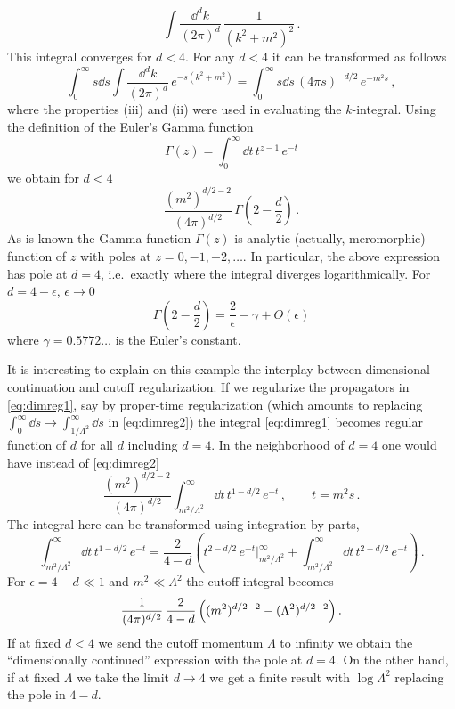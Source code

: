 \begin{equation}\label{eq:dimreg1}
\int\frac{\dd^dk}{(2\pi)^d}\,\frac1{(k^2+m^2)^2}\,.
\end{equation}
This integral converges for $d<4$. For any $d<4$ it can be transformed as
follows
\begin{equation}\label{eq:dimreg2}
\int_0^\infty s\dd s\int\frac{\dd^dk}{(2\pi)^d}\,e^{-s(k^2+m^2)}=\int_0^\infty s\dd s\,(4\pi s)^{-d/2}\,e^{-m^2s}\,,
\end{equation}
where the properties (iii) and (ii) were used in evaluating the $k$-integral.
Using the definition of the Euler's Gamma function
\[
\Gamma(z)=\int_0^\infty \dd t\,t^{z-1}\,e^{-t}
\]
we obtain for $d<4$
\begin{equation}\label{eq:dimreg3}
\frac{(m^2)^{d/2-2}}{(4\pi)^{d/2}}\,\Gamma\left(2-\frac d2\right)\,.
\end{equation}
As is known the Gamma function $\Gamma(z)$ is analytic (actually, meromorphic)
function of $z$ with poles at $z=0,-1,-2,\dots$. In particular, the above
expression has pole at $d=4$, i.e.\ exactly where the integral diverges
logarithmically. For $d=4-\epsilon$, $\epsilon\to0$
\[
\Gamma\left(2-\frac d2\right)=\frac2\epsilon-\gamma+O(\epsilon)
\]
where $\gamma=0.5772\ldots$ is the Euler's constant.

It is interesting to explain on this example the interplay between dimensional
continuation and cutoff regularization. If we regularize the propagators in
\eqref{eq:dimreg1}, say by proper-time regularization (which amounts to
replacing $\int_0^\infty \dd s\to\int_{1/\Lambda^2}^\infty \dd s$ in
\eqref{eq:dimreg2}) the integral \eqref{eq:dimreg1} becomes regular function of
$d$ for all $d$ including $d=4$. In the neighborhood of $d=4$ one would have
instead of \eqref{eq:dimreg2}
\[
\frac{(m^2)^{d/2-2}}{(4\pi)^{d/2}}\int_{m^2/\Lambda^2}^\infty \dd t\,t^{1-d/2}\,e^{-t}\,,\qquad t=m^2s\,.
\]
The integral here can be transformed using integration by parts,
\[
\int_{m^2/\Lambda^2}^\infty \dd t\,t^{1-d/2}\,e^{-t}=\frac2{4-d}\left(t^{2-d/2}\,e^{-t}\Big|_{m^2/\Lambda^2}^\infty+\int_{m^2/\Lambda^2}^\infty \dd t\,t^{2-d/2}\,e^{-t}\right)\,.
\]
For $\epsilon=4-d\ll1$ and $m^2\ll\Lambda^2$ the cutoff integral becomes
\[
\frac1{(4\pi)^{d/2}}\,\frac2{4-d}\,\Bigl((m^2)^{d/2-2}-(\Lambda^2)^{d/2-2}\Bigr)\,.
\]
If at fixed $d<4$ we send the cutoff momentum $\Lambda$ to infinity we obtain
the ``dimensionally continued'' expression with the pole at $d=4$. On the other
hand, if at fixed $\Lambda$ we take the limit $d\to4$ we get a finite result
with $\log\Lambda^2$ replacing the pole in $4-d$.

